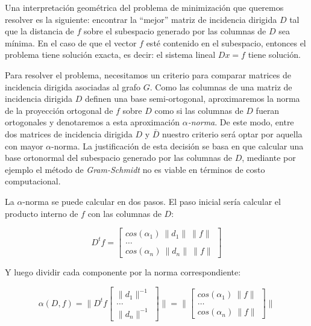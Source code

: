 \documentclass[conference,compsoc,a4paper]{IEEEtran}
\begin{document}
Una interpretación geométrica del problema de minimización que queremos 
resolver es la siguiente: encontrar la ``mejor'' matriz de incidencia 
dirigida $D$ tal que la distancia de $f$ sobre el subespacio 
generado por las columnas de $D$ sea mínima. En el caso de que 
el vector $f$ esté contenido en el subespacio, entonces el problema 
tiene solución exacta, es decir: el sistema lineal $Dx = f$ tiene 
solución.

\smallskip

Para resolver el problema, necesitamos un criterio para comparar  
matrices de incidencia dirigida asociadas al grafo $G$. Como las 
columnas de una matriz de incidencia dirigida $D$ definen una base 
semi-ortogonal, aproximaremos la norma de la proyección 
ortogonal de $f$ sobre $D$ como si las columnas de $D$ fueran 
ortogonales y denotaremos a esta aproximación \textit{$\alpha$-norma}.
 De este modo, entre dos matrices de incidencia dirigida $D$ y 
 $\bar{D}$ nuestro criterio será optar por aquella con mayor 
 $\alpha$-norma. La justificación de esta decisión se basa en que 
 calcular una base ortonormal del subespacio generado por las columnas 
 de $D$, mediante por ejemplo el método de \emph{Gram-Schmidt} 
 \cite{WK:2009} no es viable en términos de costo computacional.

\smallskip

La $\alpha$-norma se puede calcular en dos pasos. El paso inicial sería 
calcular el producto interno de $f$ con las columnas de $D$:

$$
D^t f = \begin{bmatrix}
	cos(\alpha_1) \ \|d_1\| \ \|f\|\\
	\dots \\
	cos(\alpha_n) \ \|d_n\| \ \|f\|
\end{bmatrix}
$$

\smallskip

Y luego dividir cada componente por la norma correspondiente:

$$
\alpha(D,f) = \| D^t f
\begin{bmatrix}
	\|d_1\|^{-1}\\
	\dots \\
	\|d_n\|^{-1} 
\end{bmatrix} \|= \|\begin{bmatrix}
	cos(\alpha_1) \ \|f\|\\
	\dots \\
	cos(\alpha_n) \ \|f\|
\end{bmatrix}\|
$$

\smallskip
\end{document}
